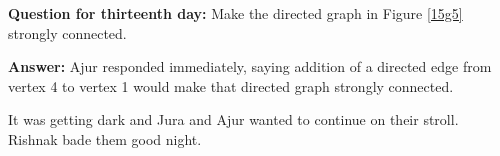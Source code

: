\textbf{Question for thirteenth day:} Make the directed graph in Figure \ref{15g5} strongly connected. 

\textbf{Answer:} Ajur responded immediately, saying  addition of a directed edge from vertex 4 to vertex 1 would make that directed graph strongly connected.

It was getting dark and Jura and Ajur wanted to continue on their stroll. Rishnak bade them good night.
